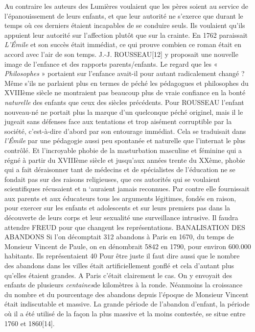  Au contraire les auteurs des Lumières voulaient que les pères soient au service de l'épanouissement de leurs enfants, et que leur autorité ne s'exerce que durant le temps où ces derniers étaient incapables de se conduire seuls. Ils voulaient qu'ils appuient leur autorité sur l'affection plutôt que sur la crainte. En 1762 paraissait\emph{ L'Émile} et son succès était immédiat, ce qui prouve combien ce roman était en accord avec l'air de son temps. J.-J. ROUSSEAU[12] y proposait une nouvelle image de l'enfance et des rapports parents/enfants. 
 Le regard que les « \emph{Philosophes} » portaient sur l'enfance avait-il pour autant radicalement changé ? Même s'ils ne parlaient plus en termes de péché les pédagogues et philosophes du XVIIIème siècle ne montraient pas beaucoup plus de vraie confiance en la bonté \emph{naturelle} des enfants que ceux des siècles précédents. Pour ROUSSEAU l'enfant nouveau-né ne portait plus la marque d'un quelconque péché originel, mais il le jugeait sans défenses face aux tentations et trop aisément corruptible par la société, c'est-à-dire d'abord par son entourage immédiat. Cela se traduisait dans \emph{l'Émile} par une pédagogie aussi peu spontanée et naturelle que l'internat le plus contrôlé. Et l'incroyable phobie de la masturbation masculine et féminine qui a régné à partir du XVIIIème siècle et jusqu'aux années trente du XXème, phobie qui a fait déraisonner tant de médecins et de spécialistes de l'éducation ne se fondait pas sur des raisons religieuses, que ces autorités qui se voulaient scientifiques récusaient et n ‘auraient jamais reconnues. Par contre elle fournissait aux parents et aux éducateurs tous les arguments légitimes, fondés en raison, pour exercer sur les enfants et adolescents et sur leurs premiers pas dans la découverte de leurs corps et leur sexualité une surveillance intrusive. Il faudra attendre FREUD pour que changent les représentations.
BANALISATION DES ABANDONS
 Si l'on décomptait 312 abandons à Paris en 1670, du temps de Monsieur Vincent de Paule, on en dénombrait 5842 en 1790, pour environ 600.000 habitants. Ils représentaient 40 %
 Pour être juste il faut dire aussi que le nombre des abandons dans les villes était artificiellement gonflé et cela d'autant plus qu'elles étaient grandes. A Paris c'était clairement le cas. On y envoyait des enfants de plusieurs \emph{centaines}de kilomètres à la ronde. Néanmoins la croissance du nombre et du pourcentage des abandons depuis l'époque de Monsieur Vincent était indiscutable et massive. La grande période de l'abandon d'enfant, la période où il a été utilisé de la façon la plus massive et la moins contestée, se situe entre 1760 et 1860[14].
